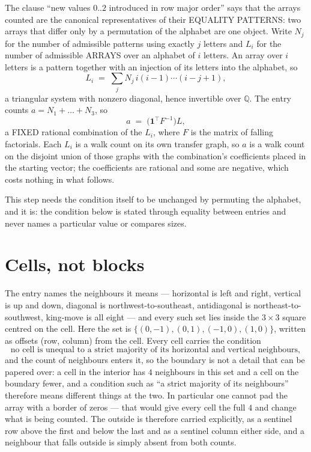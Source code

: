 \documentclass[11pt,a4paper]{article}
\theoremstyle{plain}
\theoremstyle{definition}
\begin{document}
The clause ``new values $0..2$ introduced in row major order'' says that the arrays
counted are the canonical representatives of their EQUALITY PATTERNS: two arrays that differ
only by a permutation of the alphabet are one object. Write $N_j$ for the number of admissible
patterns using exactly $j$ letters and $L_i$ for the number of admissible ARRAYS over an
alphabet of $i$ letters. An array over $i$ letters is a pattern together with an injection of
its letters into the alphabet, so
\[
L_i\;=\;\sum_{j}N_j\,i(i-1)\cdots(i-j+1),
\]
a triangular system with nonzero diagonal, hence invertible over $\mathbb{Q}$. The entry
counts $a=N_1+\dots+N_{3}$, so
\[
a\;=\;\bigl(\mathbf{1}^{\!\top}F^{-1}\bigr)L ,
\]
a FIXED rational combination of the $L_i$, where $F$ is the matrix of falling factorials.
Each $L_i$ is a walk count on its own transfer graph, so $a$ is a walk count on the disjoint
union of those graphs with the combination's coefficients placed in the starting vector; the
coefficients are rational and some are negative, which costs nothing in what follows.

This step needs the condition itself to be unchanged by permuting the alphabet, and it is:
the condition below is stated through equality between entries and never names a particular
value or compares sizes.

\section{Cells, not blocks}

The entry names the neighbours it means --- horizontal is left and right, vertical is up and
down, diagonal is northwest-to-southeast, antidiagonal is northeast-to-southwest, king-move is
all eight --- and every such set lies inside the $3\times3$ square centred on the cell. Here
the set is $\{(0,-1), (0,1), (-1,0), (1,0)\}$, written as offsets (row, column) from the cell. Every cell carries
the condition
\[
\text{no cell is unequal to a strict majority of its horizontal and vertical neighbours},
\]
and the count of neighbours enters it, so the boundary is not a detail that can be papered
over: a cell in the interior has $4$ neighbours in this set and a cell on the boundary
fewer, and a condition such as ``a strict majority of its neighbours'' therefore means
different things at the two. In particular one cannot pad the array with a border of zeros ---
that would give every cell the full $4$ and change what is being counted. The outside is
therefore carried
explicitly, as a sentinel row above the first and below the last and as a sentinel column
either side, and a neighbour that falls outside is simply absent from both counts.
\end{document}
